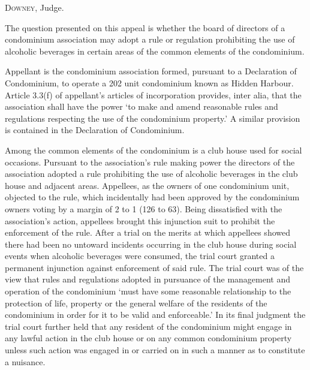 

\opinion \textsc{Downey}, Judge.

The question presented on this appeal is whether the board of directors of a
condominium association may adopt a rule or regulation prohibiting the use of
alcoholic beverages in certain areas of the common elements of the condominium.

Appellant is the condominium association formed, pursuant to a Declaration of
Condominium, to operate a 202 unit condominium known as Hidden Harbour. Article
3.3(f) of appellant's articles of incorporation provides, inter alia, that the
association shall have the power `to make and amend reasonable rules and
regulations respecting the use of the condominium property.' A similar provision
is contained in the Declaration of Condominium.

Among the common elements of the condominium is a club house used for social
occasions. Pursuant to the association's rule making power the directors of the
association adopted a rule prohibiting the use of alcoholic beverages in the
club house and adjacent areas. Appellees, as the owners of one condominium unit,
objected to the rule, which incidentally had been approved by the condominium
owners voting by a margin of 2 to 1 (126 to 63). Being dissatisfied with the
association's action, appellees brought this injunction suit to prohibit the
enforcement of the rule. After a trial on the merits at which appellees showed
there had been no untoward incidents occurring in the club house during social
events when alcoholic beverages were consumed, the trial court granted a
permanent injunction against enforcement of said rule. The trial court was of
the view that rules and regulations adopted in pursuance of the management and
operation of the condominium `must have some reasonable relationship to the
protection of life, property or the general welfare of the residents of the
condominium in order for it to be valid and enforceable.' In its final judgment
the trial court further held that any resident of the condominium might engage
in any lawful action in the club house or on any common condominium property
unless such action was engaged in or carried on in such a manner as to
constitute a nuisance.

